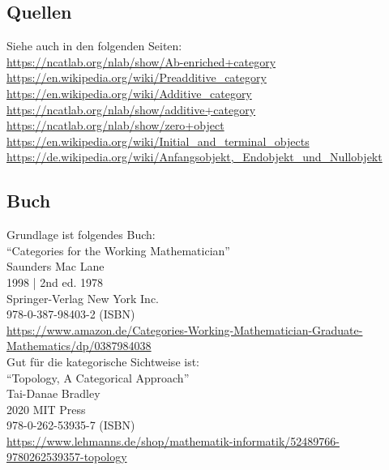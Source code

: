 \documentclass[a4paper]{amsart}
\theoremstyle{definition}
\begin{document}
\subsection*{Quellen}
Siehe auch in den folgenden Seiten:\\
\url{https://ncatlab.org/nlab/show/Ab-enriched+category}\\
\url{https://en.wikipedia.org/wiki/Preadditive_category}\\
\url{https://en.wikipedia.org/wiki/Additive_category}\\
\url{https://ncatlab.org/nlab/show/additive+category}\\
\url{https://ncatlab.org/nlab/show/zero+object}\\
\url{https://en.wikipedia.org/wiki/Initial_and_terminal_objects}\\
\url{https://de.wikipedia.org/wiki/Anfangsobjekt,_Endobjekt_und_Nullobjekt}

\subsection*{Buch}
Grundlage ist folgendes Buch:\\
"`Categories for the Working Mathematician"'\\
Saunders Mac Lane\\
1998 | 2nd ed. 1978\\
Springer-Verlag New York Inc.\\
978-0-387-98403-2 (ISBN)\\
{\tiny
   \url{https://www.amazon.de/Categories-Working-Mathematician-Graduate-Mathematics/dp/0387984038}}\\

Gut für die kategorische Sichtweise ist:\\
"`Topology, A Categorical Approach"'\\
Tai-Danae Bradley\\
2020 MIT Press\\
978-0-262-53935-7 (ISBN)\\ 
{\tiny
\url{https://www.lehmanns.de/shop/mathematik-informatik/52489766-9780262539357-topology}}\\
\end{document}
